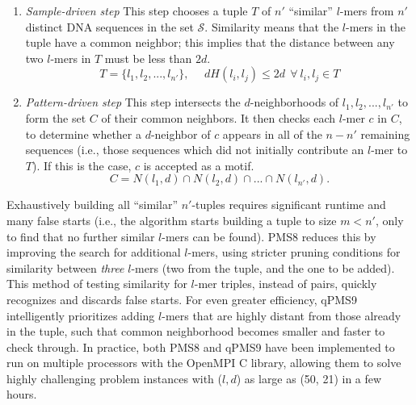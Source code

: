 \documentclass[oneside,12pt]{DISCSthesis}
\begin{document}
		\begin{enumerate}
			\item {\em Sample-driven step}\newline
			This step chooses a tuple $T$ of $n'$ ``similar'' $l$-mers from $n'$ distinct DNA sequences in the set $\mathcal{S}$. Similarity means that the $l$-mers in the tuple have a common neighbor; this implies that the distance between any two $l$-mers in $T$ must be less than $2d$.
			\begin{equation} T = \{l_{1}, l_{2}, ..., l_{n'}\},\ \ \ \ \ \ 
			dH(l_{i}, l_{j}) \leq 2d\ \ \forall\ l_{i}, l_{j} \in T \end{equation}

			\item {\em Pattern-driven step}\newline
			This step intersects the $d$-neighborhoods of $l_{1}, l_{2}, ..., l_{n'}$ to form the set $C$ of their common neighbors. It then checks each $l$-mer $c$ in $C$, to determine whether a $d$-neighbor of $c$ appears in all of the $n-n'$ remaining sequences (i.e., those sequences which did not initially contribute an $l$-mer to $T$). If this is the case, $c$ is accepted as a motif.
			\begin{equation} C = N(l_{1}, d) \cap N(l_{2}, d) \cap...\cap N(l_{n'}, d). \end{equation}
		\end{enumerate}
		\vspace{-5mm}
		\noindent Exhaustively building all ``similar'' $n'$-tuples requires significant runtime and many false starts (i.e., the algorithm starts building a tuple to size $m < n'$, only to find that no further similar $l$-mers can be found).
		PMS8 reduces this by improving the search for additional $l$-mers, using stricter pruning conditions for similarity %
		between {\em three} $l$-mers (two from the tuple, and the one to be added). This method of testing similarity for $l$-mer triples, instead of pairs, quickly recognizes and discards false starts. For even greater efficiency, qPMS9 intelligently prioritizes adding $l$-mers that are highly distant from those already in the tuple, such that common neighborhood becomes smaller and faster to check through.
		In practice, both PMS8 and qPMS9 have been implemented to run on multiple processors with the OpenMPI C library, allowing them to solve highly challenging problem instances with ($l, d$) as large as (50, 21) in a few hours.
\end{document}
